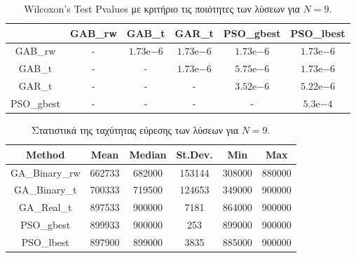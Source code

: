 \documentclass[12pt, a4paper]{article}
\newcommand{\en}{\selectlanguage{english}}
\newcommand{\gr}{\selectlanguage{greek}}
\begin{document}
\begin{table}[H]
	\centering
	\begin{tabular}{| c | c | c | c | c | c |}
		
		\hline
		\en  & \en GAB\_rw & \en GAB\_t & \en GAR\_t & \en PSO\_gbest & \en PSO\_lbest\\
		
		\hline
		\en GAB\_rw & - & $1.73\mathrm{e}{-6}$ & $1.73\mathrm{e}{-6}$ & $1.73\mathrm{e}{-6}$ & $1.73\mathrm{e}{-6}$ \\ 
		
		\hline
		\en GAB\_t & - & - & $1.73\mathrm{e}{-6}$ & $5.75\mathrm{e}{-6}$ & $1.73\mathrm{e}{-6}$ \\ 
		
		\hline
		\en GAR\_t & - & - & - & $3.52\mathrm{e}{-6}$ & $5.22\mathrm{e}{-6}$ \\ 
		
		\hline
		\en PSO\_gbest & - & - & - & - & $5.3\mathrm{e}{-4}$\\ 
		
		\hline
		
	\end{tabular}
	\caption{\en Wilcoxon's Test Pvalues \gr με κριτήριο τις ποιότητες των λύσεων για $N = 9$.}
	\label{tab:sol_qual_pval_N9}
\end{table}


\begin{table}[H]
	\centering
	\begin{tabular}{| c | c | c | c | c | c |}
		
		\hline
		\en Method & \en Mean & \en Median & \en St.Dev. & \en Min & \en Max \\
		
		\hline
		\en GA\_Binary\_rw & 662733 & 682000 & 153144 & 308000 & 880000 \\ 
		
		\hline
		\en GA\_Binary\_t & 700333 & 719500 & 124653 & 349000 & 900000 \\ 
		
		\hline
		\en GA\_Real\_t & 897533 & 900000 & 7181 & 864000 & 900000 \\ 
		
		\hline
		\en PSO\_gbest & 899933 & 900000 & 253 & 899000 & 900000\\ 
		
		\hline
		\en PSO\_lbest & 897900 & 899000 & 3835 & 885000 & 900000 \\ 
		
		\hline
		
	\end{tabular}
	\caption{Στατιστικά της ταχύτητας εύρεσης των λύσεων για $N = 9$.}
	\label{tab:iter_N9}
\end{table}
\end{document}
